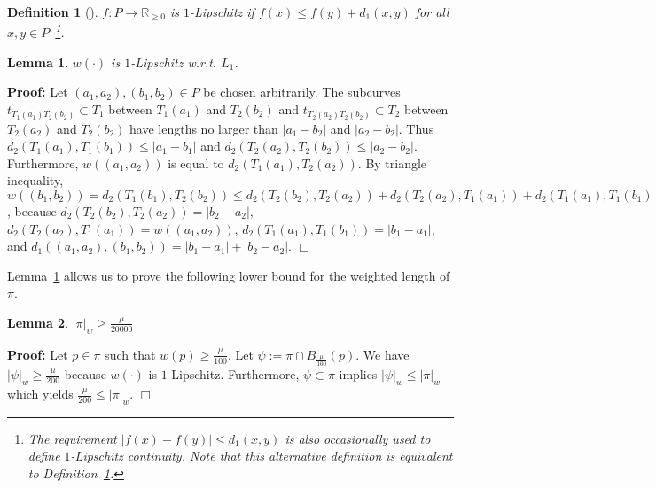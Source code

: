 \documentclass[a4paper,11pt]{article}
\newtheorem{definition}{Definition}
\newtheorem{lemma}{Lemma}
\newenvironment{proof}{\textbf{Proof:}}{\hspace*{0mm}\hfill\ensuremath{\Box}}
\begin{document}
\begin{definition}[\cite{funke:smooth}]\label{def:lip}
		$f: P \rightarrow \mathbb{R}_{\geq 0}$ is $1$-Lipschitz if $f(x) \leq f(y) + d_1(x,y)$ for all $x,y \in P$~\footnote{The requirement $|f(x)-f(y)|\leq d_1(x,y)$ is also occasionally used to define $1$-Lipschitz continuity. Note that this alternative definition is equivalent to Definition~\ref{def:lip}.}.
	\end{definition}

\begin{lemma}\label{lem:lip}
	$w(\cdot)$ is $1$-Lipschitz w.r.t. $L_1$.
\end{lemma}
\begin{proof}
	Let $(a_1,a_2), (b_1,b_2) \in P$ be chosen arbitrarily. The subcurves $t_{T_1(a_1)T_2(b_2)} \subset T_1$ between $T_1(a_1)$ and $T_2(b_2)$ and $t_{T_2(a_2)T_2(b_2)} \subset T_2$ between $T_2(a_2)$ and $T_2(b_2)$ have lengths no larger than $|a_1 - b_2|$ and $|a_2 - b_2|$. Thus $d_2 (T_1(a_1), T_1(b_1)) \leq |a_1 - b_1|$ and $d_2 (T_2(a_2), T_2(b_2)) \leq |a_2 - b_2|$. Furthermore, $w((a_1,a_2))$ is equal to $d_2 (T_1(a_1), T_2 (a_2) )$. By triangle inequality,  $w((b_1,b_2)) = d_2 \left( T_1(b_1), T_2(b_2) \right) \leq d_2( T_2(b_2), T_2(a_2) )+ d_2 (T_2(a_2), T_1(a_1) ) + d_2 (T_1(a_1), T_1(b_1) ) \leq d_1 ((a_1,a_2), (b_1,b_2)) + w ((a_1,a_2))$, because $d_2(T_2(b_2), T_2(a_2)) = |b_2 - a_2|$, $d_2(T_2(a_2), T_1(a_1)) = w((a_1,a_2))$, $d_2(T_1(a_1), T_1(b_1)) = |b_1 - a_1|$, and $d_1((a_1,a_2), (b_1,b_2)) = |b_1-a_1| + |b_2-a_2|$. \end{proof}

	Lemma~\ref{lem:lip} allows us to prove the following lower bound for the weighted length of $\pi$.

\begin{lemma}\label{lem:lowerBoundForSummedFDcase1}
	$|\pi|_w \geq \frac{\mu}{20000}$
\end{lemma}
\begin{proof}
	Let $p \in \pi$ such that $w(p) \geq \frac{\mu}{100}$. Let $\psi := \pi \cap B_{\frac{\mu}{100}}(p)$. We have $|\psi|_w \geq \frac{\mu}{200}$ because $w(\cdot)$ is $1$-Lipschitz. Furthermore, $\psi \subset \pi$ implies $|\psi|_w \leq |\pi|_w$ which yields $\frac{\mu}{200} \leq |\pi|_w$.
\end{proof}
\end{document}
